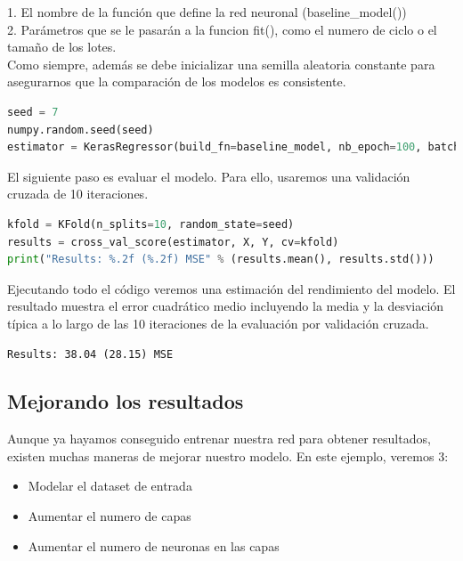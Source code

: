 1. El nombre de la función que define la red neuronal (baseline\_model())\\
2. Parámetros que se le pasarán a la funcion fit(), como el numero de ciclo o el tamaño de los lotes.\\
Como siempre, además se debe inicializar una semilla aleatoria constante para asegurarnos que la comparación de los modelos es consistente.
\begin{lstlisting}[language=Python]
seed = 7
numpy.random.seed(seed)
estimator = KerasRegressor(build_fn=baseline_model, nb_epoch=100, batch_size=5, verbose=0)
\end{lstlisting}
El siguiente paso es evaluar el modelo. Para ello, usaremos una validación cruzada de 10 iteraciones.\\
\begin{lstlisting}[language=Python]
kfold = KFold(n_splits=10, random_state=seed)
results = cross_val_score(estimator, X, Y, cv=kfold)
print("Results: %.2f (%.2f) MSE" % (results.mean(), results.std()))
\end{lstlisting}
Ejecutando todo el código veremos una estimación del rendimiento del modelo. El resultado muestra el error cuadrático medio incluyendo la media y la desviación típica a lo largo de las 10 iteraciones de la evaluación por validación cruzada.
\begin{verbatim}
Results: 38.04 (28.15) MSE
\end{verbatim}
\subsection{Mejorando los resultados}
Aunque ya hayamos conseguido entrenar nuestra red para obtener resultados, existen muchas maneras de mejorar nuestro modelo. En este ejemplo, veremos 3:
\begin{itemize}
\item Modelar el dataset de entrada
\item Aumentar el numero de capas
\item Aumentar el numero de neuronas en las capas
\end{itemize}
